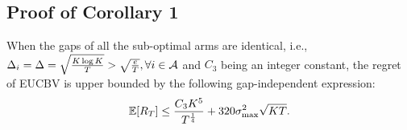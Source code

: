 %

\subsection{Proof of Corollary 1}
\label{App:Corollary:1}

\begin{corollary}
When the gaps of all the sub-optimal arms are identical, i.e., $\Delta_i =\Delta = \sqrt{\frac{K\log K}{T}}>\sqrt{\frac{e}{T}}, \forall i\in \mathcal{A}$ and $C_3$ being an integer constant, the
regret of EUCBV is upper bounded by the following gap-independent expression:
\begin{align*}
	\mathbb{E}[R_{T}]\leq  \dfrac{C_3 K^5}{T^{\frac{1}{4}}} + 320\sigma_{\max}^2\sqrt{KT}.
\end{align*}	
\end{corollary}


